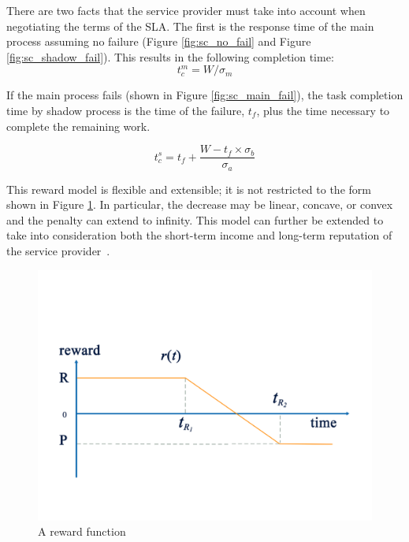 %

There are two facts that the service provider must take into account
when negotiating the terms of the SLA. The first is the response time
of the main process assuming no failure (Figure
\ref{fig:sc_no_fail} and Figure \ref{fig:sc_shadow_fail}). This
results in the following completion time:
\begin{equation}
t_c^m=W/\sigma_m
\label{eq:tcm}
\end{equation}

If the main process fails (shown in Figure \ref{fig:sc_main_fail}), the
task completion time by shadow process is the time of the failure,
$t_f$, plus the time necessary to complete the remaining work.

\begin{equation}
t_c^s=t_f+\frac{W-t_f \times \sigma_b}{\sigma_a}
\label{eq:tcs}
\end{equation}

This reward model is flexible and extensible; it is not restricted to
the form shown in Figure \ref{fig:reward}. In particular, the decrease
may be linear, concave, or convex and the penalty can extend to
infinity. This model can further be extended to take into
consideration both the short-term income and long-term reputation of
the service provider~\cite{Daw:2002:LRP:639717.639720}.


\begin{figure}[t!]	
	\begin{center}
		\includegraphics[width=\columnwidth]{diagrams/reward.pdf}
	\end{center}
	\caption{A reward function}
	\label{fig:reward}
\end{figure}


